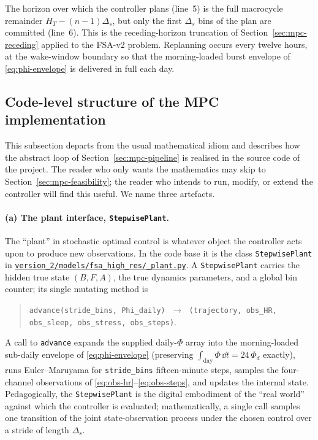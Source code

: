 The horizon over which the controller plans (line~5) is the full macrocycle
remainder $H_T - (n-1)\Delta_s$, but only the first $\Delta_s$ bins of the
plan are committed (line~6). This is the receding-horizon truncation of
Section~\ref{sec:mpc-receding} applied to the FSA-v2 problem. Replanning
occurs every twelve hours, at the wake-window boundary so that the
morning-loaded burst envelope of \eqref{eq:phi-envelope} is delivered in
full each day.

\subsection{Code-level structure of the MPC implementation}\label{sec:mpc-code}

This subsection departs from the usual mathematical idiom and describes
how the abstract loop of Section~\ref{sec:mpc-pipeline} is realised in
the source code of the project. The reader who only wants the
mathematics may skip to Section~\ref{sec:mpc-feasibility}; the reader
who intends to run, modify, or extend the controller will find this
useful. We name three artefacts.

\paragraph{(a) The plant interface, \texttt{StepwisePlant}.} The
``plant'' in stochastic optimal control is whatever object the
controller acts upon to produce new observations. In the code base it is
the class \texttt{StepwisePlant} in
\href{run:../version_2/models/fsa_high_res/_plant.py}{\texttt{version\_2/models/fsa\_high\_res/\_plant.py}}.
A \texttt{StepwisePlant} carries the hidden true state $(B,F,A)$, the
true dynamics parameters, and a global bin counter; its single mutating
method is
\begin{quote}\small
\verb|advance(stride_bins, Phi_daily)|
$\;\to\;$ \texttt{(trajectory, obs\_HR, obs\_sleep, obs\_stress, obs\_steps)}.
\end{quote}
A call to \texttt{advance} expands the supplied daily-$\Phi$ array into
the morning-loaded sub-daily envelope of \eqref{eq:phi-envelope}
(preserving $\int_{\text{day}}\Phi\,\dd t = 24\,\Phi_d$ exactly), runs
Euler--Maruyama for \texttt{stride\_bins} fifteen-minute steps, samples
the four-channel observations of \eqref{eq:obs-hr}--\eqref{eq:obs-steps},
and updates the internal state. Pedagogically, the
\texttt{StepwisePlant} is the digital embodiment of the ``real world''
against which the controller is evaluated; mathematically, a single call
samples one transition of the joint state-observation process under the
chosen control over a stride of length $\Delta_s$.

